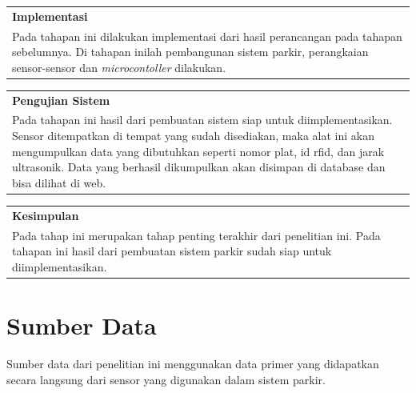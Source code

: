 \begin{table} [H]
    \begin{tabular}{|>{\centering\arraybackslash}m{1\linewidth} |}
        \hline
        \textbf{Implementasi}\\ 
        Pada tahapan ini dilakukan implementasi dari hasil perancangan pada tahapan sebelumnya. Di tahapan inilah pembangunan sistem parkir, perangkaian sensor-sensor dan \textit{microcontoller} dilakukan.\\
        \hline
    \end{tabular}
\end{table}

\begin{center}
    \bigg\downarrow
\end{center}

\begin{table} [H]
    \begin{tabular}{|>{\centering\arraybackslash}m{1\linewidth} |}
        \hline
        \textbf{Pengujian Sistem}\\ 
        Pada tahapan ini hasil dari pembuatan sistem siap untuk diimplementasikan. Sensor ditempatkan di tempat yang sudah disediakan, maka alat ini akan mengumpulkan data yang dibutuhkan seperti nomor plat, id rfid, dan jarak ultrasonik. Data yang berhasil dikumpulkan akan disimpan di database dan bisa dilihat di web.\\
        \hline
    \end{tabular}
\end{table}

\begin{center}
    \bigg\downarrow
\end{center}

\begin{table} [H]
    \begin{tabular}{|>{\centering\arraybackslash}m{1\linewidth} |}
        \hline
        \textbf{Kesimpulan}\\ 
        Pada tahap ini merupakan tahap penting terakhir dari penelitian ini. Pada tahapan ini hasil dari pembuatan sistem parkir sudah siap untuk diimplementasikan.\\
        \hline
    \end{tabular}
\end{table}

\section{Sumber Data}
Sumber data dari penelitian ini menggunakan data primer yang didapatkan secara langsung dari sensor yang digunakan dalam sistem parkir.

